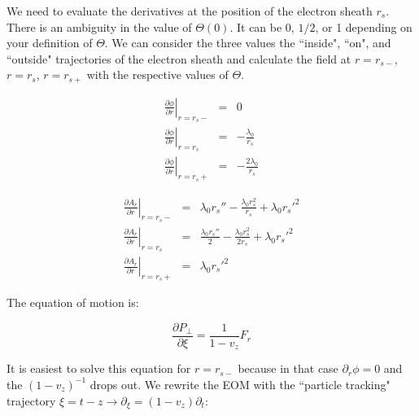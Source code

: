 \documentclass[aps,prl,preprint,groupedaddress]{revtex4-1}
\begin{document}
We need to evaluate the derivatives at the position of the electron sheath $r_s$. There is an ambiguity in the value of $\Theta(0)$. It can be 0, $1/2$, or 1 depending on your definition of $\Theta$. We can consider the three values the ``inside", ``on", and ``outside" trajectories of the electron sheath and calculate the field at $r=r_{s-}$,  $r=r_{s}$,  $r=r_{s+}$ with the respective values of $\Theta$.

\begin{equation}\label{eq:dphi_all}
\begin{array}{lcl}
\left.\frac{\partial \phi}{\partial r} \right|_{r=r_s-} & = & 0 \\
\left.\frac{\partial \phi}{\partial r} \right|_{r=r_s} & = & -\frac{\lambda_0}{r_s} \\
\left.\frac{\partial \phi}{\partial r} \right|_{r=r_s+} & = & -\frac{2\lambda_0}{r_s}
\end{array}
\end{equation}

\begin{equation}\label{eq:dA_r_all}
\begin{array}{lcl}
\left.\frac{\partial A_r}{\partial r} \right|_{r=r_s-} & = & \lambda_0 r_s'' - \frac{\lambda_0 r_s^2}{r_s} + \lambda_0 r_s'^2 \\
\left.\frac{\partial A_r}{\partial r} \right|_{r=r_s} & = & \frac{\lambda_0 r_s''}{2} - \frac{\lambda_0 r_s^2}{2 r_s} + \lambda_0 r_s'^2\\
\left.\frac{\partial A_r}{\partial r} \right|_{r=r_s+} & = & \lambda_0 r_s'^2
\end{array}
\end{equation}


The equation of motion is: 

\begin{equation}\label{eq:EOM_1}
\frac{\partial P_\perp}{\partial \xi} = \frac{1}{1-v_z} F_r
\end{equation}

It is easiest to solve this equation for $r=r_{s-}$ because in that case $\partial_r \phi = 0$ and the $(1-v_z)^{-1}$ drops out. We rewrite the EOM with the ``particle tracking" trajectory $\xi = t - z \rightarrow \partial_{\xi} = (1-v_z)\partial_t$:
\end{document}
